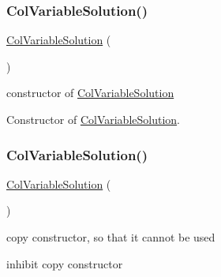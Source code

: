 \subsubsection{\texorpdfstring{Col\+Variable\+Solution()}{ColVariableSolution()}\hspace{0.1cm}{\footnotesize\ttfamily [1/2]}}
{\footnotesize\ttfamily \mbox{\hyperlink{class_s_m_spp__di__unipi__it_1_1_col_variable_solution}{Col\+Variable\+Solution}} (\begin{DoxyParamCaption}{ }\end{DoxyParamCaption})\hspace{0.3cm}{\ttfamily [inline]}}



constructor of \mbox{\hyperlink{class_s_m_spp__di__unipi__it_1_1_col_variable_solution}{Col\+Variable\+Solution}} 

Constructor of \mbox{\hyperlink{class_s_m_spp__di__unipi__it_1_1_col_variable_solution}{Col\+Variable\+Solution}}. \mbox{\label{class_s_m_spp__di__unipi__it_1_1_col_variable_solution_a3394024679af2d8c403f290b98add1da}} 
\subsubsection{\texorpdfstring{Col\+Variable\+Solution()}{ColVariableSolution()}\hspace{0.1cm}{\footnotesize\ttfamily [2/2]}}
{\footnotesize\ttfamily \mbox{\hyperlink{class_s_m_spp__di__unipi__it_1_1_col_variable_solution}{Col\+Variable\+Solution}} (\begin{DoxyParamCaption}\item[{const \mbox{\hyperlink{class_s_m_spp__di__unipi__it_1_1_col_variable_solution}{Col\+Variable\+Solution}} \&}]{ }\end{DoxyParamCaption})\hspace{0.3cm}{\ttfamily [inline]}}



copy constructor, so that it cannot be used 

inhibit copy constructor 

